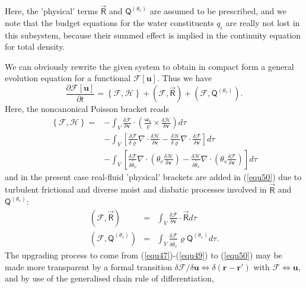 Here, the 'physical' terms $\vec{\mathsf{R}}$ and $\mathsf{Q}^{\left( \theta_v\right) }$ are assumed to be prescribed, and we note that the budget equations for the water constituents $q_i$ are really not lost in this subsystem, because their summed effect is implied in the continuity equation for total density. 

We can obviously rewrite the given system to obtain in compact form a general evolution equation for a functional $\mathcal{F}\left[\mathbf{u}\right]$. Thus we have
\begin{equation}
\frac{\partial \mathcal{F}\left[\mathbf{u}\right]}
{\partial t} = \left\lbrace \mathcal{F} , \mathcal{H} \right\rbrace    + \left(\mathcal{F},\vec{\mathsf{R}}\right) + \left(\mathcal{F}, \mathsf{Q}^{\left( \theta_v\right)}\right).\label{equ50}
\end{equation}
Here, the noncanonical Poisson bracket reads
\begin{align}
\left\lbrace \mathcal{F} , \mathcal{H} \right\rbrace = 
& - \int_V  \frac{\delta \mathcal{F}}{\delta \mathbf{v}}\cdot \left(\frac{\boldsymbol{\omega}_a}{\varrho}\times \frac{\delta \mathcal{H}}{\delta \mathbf{v}} \right) d \tau  \label{equ51} \\
&- \int_V \left[ \frac{\delta \mathcal{F}}{\delta \varrho} \nabla \cdot \frac{\delta \mathcal{H}}{\delta \mathbf{v}} - \frac{\delta \mathcal{H}}{\delta \varrho} \nabla \cdot \frac{\delta \mathcal{F}}{\delta \mathbf{v}} \right] d \tau  \nonumber\\
&- \int_V \left[\frac{\delta \mathcal{F}}{\delta \tilde{\theta_v}}\nabla \cdot ( \theta_v\frac{\delta \mathcal{H}}{\delta \mathbf{v}})- \frac{\delta \mathcal{H}}{\delta \tilde{\theta_v}}\nabla \cdot ( \theta_v\frac{\delta \mathcal{F}}{\delta \mathbf{v}})\right] d\tau \nonumber
\end{align}
and in the present case real-fluid 'physical' brackets are added in (\ref{equ50}) due to turbulent frictional and diverse moist and diabatic processes involved in $\vec{\mathsf{R}}$ and $\mathsf{Q}^{\left( \theta_v\right)}$:
\begin{eqnarray}
\left(\mathcal{F},\vec{\mathsf{R}}\right)&=&\int_V\frac{\delta \mathcal{F}}
{\delta \mathbf{v}}\cdot \vec{\mathsf{R}} d \tau \label{equ52}\\
\left(\mathcal{F},\mathsf{Q}^{\left( \theta_v\right)}\right)&=&\int_V \frac{\delta \mathcal{F}}{\delta \tilde{\theta_v}}\varrho\mathsf{Q}^{\left( \theta_v\right)}d \tau.\label{equ53}
\end{eqnarray}
The upgrading process to come from (\ref{equ47})-(\ref{equ49}) to (\ref{equ50}) may be made more transparent by a formal transition  $\delta \mathcal{F}/\delta \mathbf{u} \Leftrightarrow \delta( \mathbf{r}-\mathbf{r}')$ with $\mathcal{F} \Leftrightarrow \mathbf{u}$, and by use of the generalised chain rule of differentiation,
